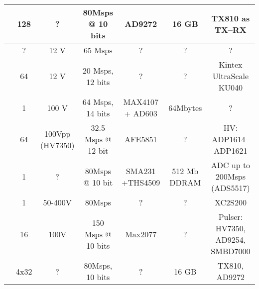 \begin{table*}[t]
\begin{tabular}{||c | c c c c c | c ||}
 \hline
 \cite{cheung_multi-channel_2012} & 	128 	& ?		& 80Msps @ 10 bits & AD9272 & 16 GB 	& TX810 as TX--RX	 \\ 
 \hline
 \cite{wall_high-_2010}	& ? 		& 12 V		& 65 Msps		& ? 		& ?		& ?  \\ 
 \hline
 \cite{ibrahim_towards_2018}	& 64		& 12 V		& 20 Msps, 12 bits	& ? 		& ?		& Kintex UltraScale KU040 \\ 
 \hline
 \cite{ricci_programmable_2006} & 1		& 100 V		& 64 Msps, 14 bits	& MAX4107 + AD603 & 64Mbytes	& ? \\ 
 \hline
 \cite{hager_ultralight:_2017} & 64		& 100Vpp (HV7350) 	& 32.5 Msps @ 12 bit & AFE5851	& ?		& HV: ADP1614--ADP1621 \\ 
 \hline
 \cite{qiu_programmable_2011}	& 1		& ? 		& 80Msps @ 10 bit  & SMA231 +THS4509 	& 512 Mb DDRAM	& ADC up to  200Msps (ADS5517) \\ 
 \hline
 \cite{fritsch_full_nodate}	& 1		& 50-400V 	& 80Msps   		& ?  		& ?		& XC2S200 \\ 
 \hline
 \cite{weng_fpga-based_2015}	& 16		& 100V 		& 150 Msps @ 10 bits   	& Max2077 	& ?		& Pulser: HV7350, AD9254, SMBD7000 \\ 
 \hline
 \cite{batbayar_hardware_2018} & 4x32		& ?		& 80Msps, 10 bits 	& ?		& 16 GB		& TX810, AD9272 \\ 

 \end{tabular}
\end{table*}

